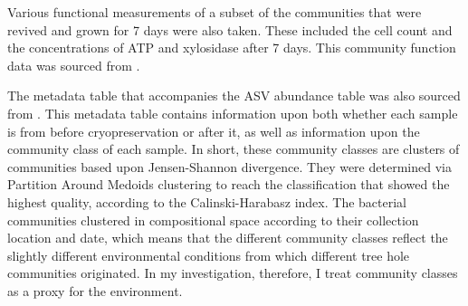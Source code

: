 \documentclass[11pt]{article}
\begin{document}
Various functional measurements of a subset of the communities that were revived and grown for 7 days were also taken. These included the cell count and the concentrations of ATP and xylosidase after 7 days. This community function data was sourced from \citep{Pascual-García2020}.

The metadata table that accompanies the ASV abundance table was also sourced from \cite{Pascual-Garc}. This metadata table contains information upon both whether each sample is from before cryopreservation or after it, as well as information upon the community class of each sample. In short, these community classes are clusters of communities based upon Jensen-Shannon divergence. They were determined via Partition Around Medoids clustering to reach the classification that showed the highest quality, according to the Calinski-Harabasz index. The bacterial communities clustered in compositional space according to their collection location and date, which means that the different community classes reflect the slightly different environmental conditions from which different tree hole communities originated. In my investigation, therefore, I treat community classes as a proxy for the environment.
\end{document}
